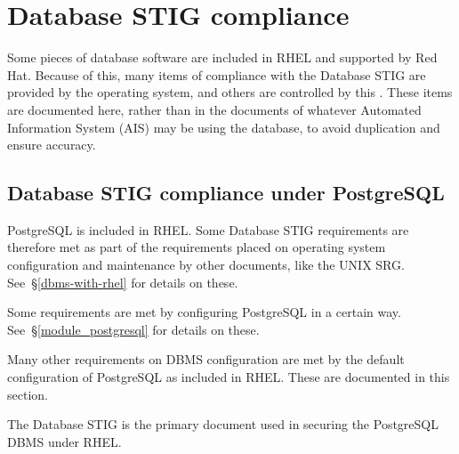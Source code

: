 %
%
%
\chapter{Database STIG compliance}
\label{DatabaseSTIGCompliance}

Some pieces of database software are included in RHEL and supported by Red
Hat. Because of this, many items of compliance with the Database STIG are
provided by the operating system, and others are controlled by this
\CMITSPolicy . These items are documented here, rather than in the
documents of whatever Automated Information System (AIS) may be using
the database, to avoid duplication and ensure accuracy.



\section{Database STIG compliance under PostgreSQL}
\label{DatabaseSTIGPostgreSQL}

PostgreSQL is included in RHEL. Some Database STIG requirements are
therefore met as part of the requirements placed on operating system
configuration and maintenance by other documents, like the UNIX SRG.
See~\S\ref{dbms-with-rhel} for details on these.

Some requirements are met by configuring PostgreSQL in a certain way.
See~\S\ref{module_postgresql} for details on these.

Many other requirements on DBMS configuration are met by the default
configuration of PostgreSQL as included in RHEL. These are documented in
this section.

\dinkus

%
The Database STIG is the primary document used in securing the PostgreSQL
DBMS under RHEL.

